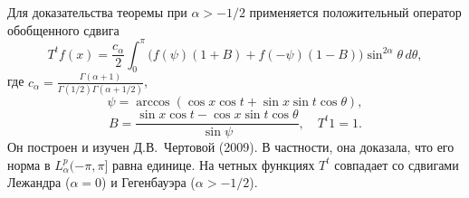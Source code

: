 Для доказательства теоремы при $\alpha>-1/2$ применяется положительный оператор
обобщенного сдвига
\[
T^{t}f(x)=\frac{c_{\alpha}}{2}\int_{0}^{\pi}\bigl(f(\psi)(1+B)+
f(-\psi)(1-B)\bigr)\sin^{2\alpha}\theta\,d\theta,
\]
где $c_{\alpha}=\frac{\Gamma(\alpha+1)}{\Gamma(1/2)\Gamma(\alpha+1/2)}$,
\[
\psi=\arccos (\cos x\cos t+\sin x\sin t\cos \theta),
\]
\[
B=\frac{\sin x\cos t-\cos x\sin t\cos \theta}{\sin \psi},\quad T^{t}1=1.
\]
Он построен и изучен Д.В.~Чертовой (2009). В частности, она доказала, что его
норма в $L_{\alpha}^{p}(-\pi,\pi]$ равна единице. На четных функциях $T^{t}$
совпадает со сдвигами Лежандра ($\alpha=0$) и Гегенбауэра ($\alpha>-1/2$).




